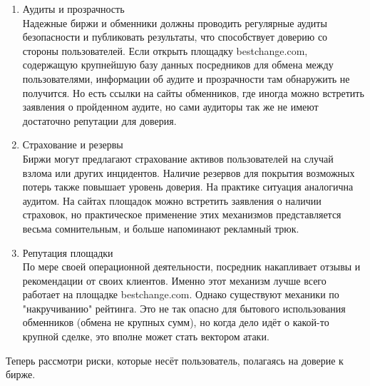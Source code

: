 \begin{enumerate}
\item Аудиты и прозрачность\\
Надежные биржи и обменники должны проводить регулярные аудиты безопасности и публиковать результаты, что способствует доверию со стороны пользователей. Если открыть площадку bestchange.com, содержащую крупнейшую базу данных посредников для обмена между пользователями, информации об аудите и прозрачности там обнаружить не получится. Но есть ссылки на сайты обменников, где иногда можно встретить заявления о пройденном аудите, но сами аудиторы так же не имеют достаточно репутации для доверия.

\item Страхование и резервы\\
Биржи могут предлагают страхование активов пользователей на случай взлома или других инцидентов. Наличие резервов для покрытия возможных потерь также повышает уровень доверия. На практике ситуация аналогична аудитом. На сайтах площадок можно встретить заявления о наличии страховок, но практическое применение этих механизмов представляется весьма сомнительным, и больше напоминают рекламный трюк.

\item Репутация площадки\\
По мере своей операционной деятельности, посредник накапливает отзывы и рекомендации от своих клиентов. Именно этот механизм лучше всего работает на площадке bestchange.com. Однако существуют механики по "накручиванию" рейтинга. Это не так опасно для бытового использования обменников (обмена не крупных сумм), но когда дело идёт о какой-то крупной сделке, это вполне может стать вектором атаки.
\end{enumerate}

Теперь рассмотри риски, которые несёт пользователь, полагаясь на доверие к бирже.

